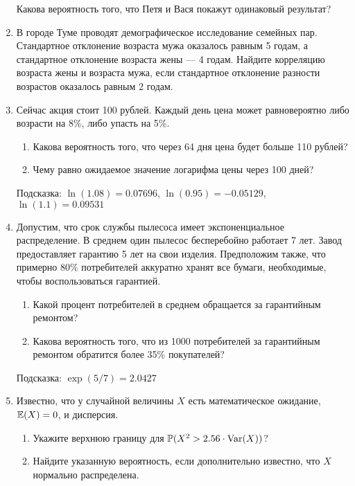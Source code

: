 \begin{enumerate}
Какова вероятность того, что Петя и Вася покажут одинаковый результат?

\item В городе Туме проводят демографическое исследование семейных пар. Стандартное отклонение возраста мужа оказалось равным 5 годам, а стандартное отклонение возраста жены — 4 годам. Найдите корреляцию возраста жены и возраста мужа, если стандартное отклонение разности возрастов оказалось равным 2 годам.

\item Сейчас акция стоит 100 рублей. Каждый день цена может равновероятно либо возрасти на 8\%, либо упасть на 5\%.
\begin{enumerate}
\item Какова вероятность того, что через 64 дня цена будет больше 110 рублей?
\item Чему равно ожидаемое значение логарифма цены через 100 дней?
\end{enumerate}
Подсказка: $\ln(1.08)=0.07696$, $\ln(0.95)=-0.05129$, $\ln(1.1)=0.09531$

\item Допустим, что срок службы пылесоса имеет экспоненциальное распределение. В среднем один пылесос бесперебойно работает 7 лет. Завод предоставляет гарантию 5 лет на свои изделия. Предположим также, что примерно 80\% потребителей аккуратно хранят все бумаги, необходимые, чтобы воспользоваться гарантией.
\begin{enumerate}
\item Какой процент потребителей в среднем обращается за гарантийным ремонтом?
\item Какова вероятность того, что из 1000 потребителей за гарантийным ремонтом обратится более 35\% покупателей?
\end{enumerate}
Подсказка: $\exp(5/7)=2.0427$

\item Известно, что у случайной величины $X$ есть
математическое ожидание, $\mathbb{E}(X)=0$, и дисперсия.
\begin{enumerate}
\item Укажите верхнюю границу для $\mathbb{P}(X^{2}>2.56\cdot \operatorname{Var}(X))$? %
\item Найдите указанную вероятность, если дополнительно известно, что
$X$ нормально распределена. %
\end{enumerate}
\end{enumerate}

